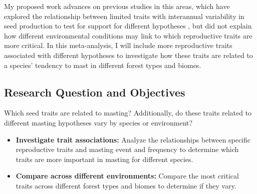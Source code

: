 \documentclass[11pt,letter]{article}
\begin{document}
My proposed work advances on previous studies in this areas, which have explored the relationship between limited traits with interannual variability in seed production to test for support for different hypotheses \citep{fernandez2019nutrient, journe2023evolution, pearse2020biogeography}, but did not explain how different environmental conditions may link to which reproductive traits are more critical. In this meta-analysis, I will include more reproductive traits associated with different hypotheses to investigate how these traits are related to a species' tendency to mast in different forest types and biomes.\par

\subsection{Research Question and Objectives}
Which seed traits are related to masting? Additionally, do these traits related to different masting hypotheses vary by species or environment?
	\begin{itemize}
	\item \textbf{Investigate trait associations:} Analyze the relationships between specific reproductive traits and masting event and frequency to determine which traits are more important in masting for different species.
	\item \textbf{Compare across different environments:} Compare the most critical traits across different forest types and biomes to determine if they vary.
	\end{itemize}
\end{document}
